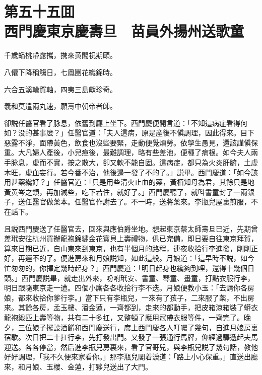 
\chapter*{第五十五囬　\\西門慶東京慶壽旦　苗員外揚州送歌童}


\begin{myquote}
千歲蟠桃帶露攜，携來黄閣祝期頤。

八僊下降稱觴日，七鳳團花織錦時。

六合五溪輸賀軸，四夷三島獻珍奇。

羲和莫遣兩丸速，願壽中朝帝者師。
\end{myquote}

卻説任醫官看了脉息，依舊到廳上坐下。西門慶便開言道：「不知這病症看得何如？没的甚事麽？」任醫官道：「夫人這病，原是産後不愼調理，因此得來。目下惡露不淨，面帶黃色，飲食也沒些要緊，走動便覺煩勞。依學生愚見，還該謹愼保重。大凡婦人產後，小兒痘後，最難調理，略有些差池，便種了病根。如今夫人兩手脉息，虚而不實，按之散大，卻又軟不能自固。這病症，都只為火炎肝腑，土虚木旺，虚血妄行。若今番不治，他後邊一發了不的了。」説畢。西門慶道：「如今該用甚薬纔好？」任醫官道：「只是用些清火止血的薬，黃栢知母為君，其餘只是地黃黄岑之類，再加減些，吃下若住，就好了。」西門慶聽了，就呌書童封了一兩銀子，送任醫官做薬本。任醫官作謝去了。不一時，送將薬來。李瓶兒屋裏煎服，不在話下。

且説西門慶送了任醫官去，回來與應伯爵坐地。想起東京蔡太師壽旦已近，先期曾差玳安往杭州買辦龍袍錦繡金花寳貝上壽禮物，俱已完備，即日要自往東京拜賀，算來日期已近，自山東來到東京，也有半個月的路程，連夜收拾行李進發，剛剛正好，再遲不的了。便進房來和月娘説知，如此這般。月娘道：「這早時不説，如今忙匆匆的，你擇定幾時起身？」西門慶道：「明日起身也纔夠到哩，還得十幾個日頭。」西門慶説畢，就走出外來，吩咐玳安、書童、琴童、畫童，打點衣服行李，明日跟隨東京走一遭。四個小廝各各收拾行李不迭。月娘便教小玉：「去請你各房娘，都來收拾你爹行李。」當下只有李瓶兒，一來有了孩子，二來服了薬，不出房來。其餘各房，孟玉樓、潘金蓮，一齊都到，走來的都動手，把皮箱涼箱裝了蟒衣龍袍緞匹上壽等物，共有二十多扛，又整頓了應用冠帶衣服等件，一齊完了。晚夕，三位娘子擺設酒餚和西門慶送行，席上西門慶各人叮囑了幾句，自進月娘房裏宿歇。次日把二十扛行李，先打發出門。又發了一張通行馬牌，仰經過驛遞起夫馬迎送。各各停當，然后進李瓶兒房裏來，看了官哥兒，與李瓶兒説了幾句話，教他好好調理，「我不久便來家看你。」那李瓶兒閣着淚道：「路上小心保重。」直送出廳來，和月娘、玉樓、金蓮，打夥兒送出了大門。

